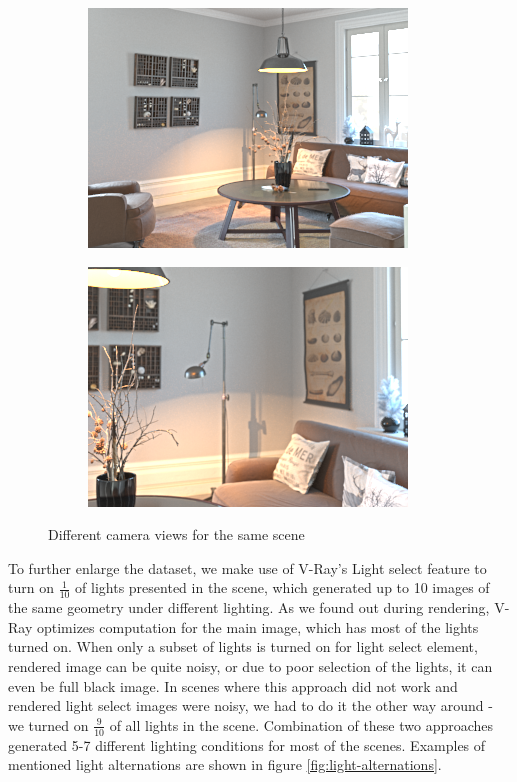 \begin{figure}
\begin{subfigure}{0.4\linewidth}
    \includegraphics[width=\linewidth]{praca/images/AI43_008_Cam05.png}
  \end{subfigure}
  \begin{subfigure}{0.4\linewidth}
    \includegraphics[width=\linewidth]{praca/images/AI43_008_Cam08.png}
  \end{subfigure}
  \caption[Different camera views for the same scene]{Different camera views for the same scene}
  \label{fig:camera-positions}
\end{figure}
\newline
To further enlarge the dataset, we make use of V-Ray's Light select feature \cite{V-Ray-Light-select} to turn on $\frac{1}{10}$ of lights presented in the scene, which generated up to 10 images of the same geometry under different lighting. As we found out during rendering, V-Ray optimizes computation for the main image, which has most of the lights turned on. When only a subset of lights is turned on for light select element, rendered image can be quite noisy, or due to poor selection of the lights, it can even be full black image. In scenes where this approach did not work and rendered light select images were noisy, we had to do it the other way around - we turned on $\frac{9}{10}$ of all lights in the scene. Combination of these two approaches generated 5-7 different lighting conditions for most of the scenes. Examples of mentioned light alternations are shown in figure \ref{fig:light-alternations}.
